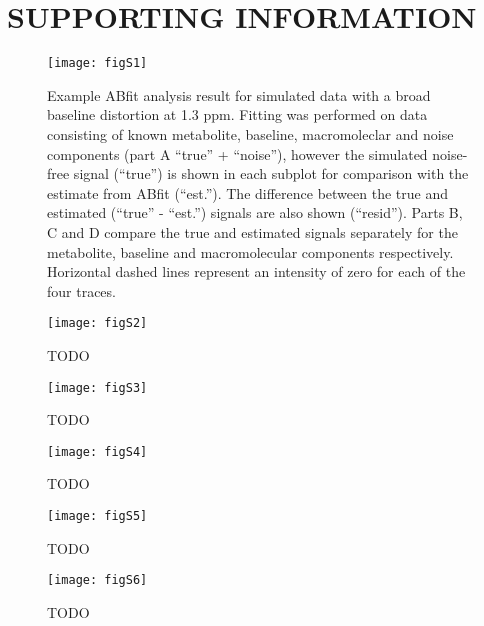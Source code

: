 \documentclass[num-refs]{wiley-article}
\begin{document}
\section*{SUPPORTING INFORMATION}

\begin{figure}[H]
  \begin{center}
    \texttt{[image: figS1]}
    \caption{Example ABfit analysis result for simulated data with a broad baseline distortion at 1.3 ppm. Fitting was performed on data consisting of known metabolite, baseline, macromoleclar and noise components (part A ``true'' + ``noise''), however the simulated noise-free signal (``true'') is shown in each subplot for comparison with the estimate from ABfit (``est.''). The difference between the true and estimated (``true'' - ``est.'') signals are also shown (``resid''). Parts B, C and D compare the true and estimated signals separately for the metabolite, baseline and macromolecular components respectively. Horizontal dashed lines represent an intensity of zero for each of the four traces.}
  \end{center}
\end{figure}

\begin{figure}
  \begin{center}
    \texttt{[image: figS2]}
    \caption{TODO}
  \end{center}
\end{figure}

\begin{figure}
  \begin{center}
    \texttt{[image: figS3]}
    \caption{TODO}
  \end{center}
\end{figure}

\begin{figure}
  \begin{center}
    \texttt{[image: figS4]}
    \caption{TODO}
  \end{center}
\end{figure}

\begin{figure}
  \begin{center}
    \texttt{[image: figS5]}
    \caption{TODO}
  \end{center}
\end{figure}

\begin{figure}
  \begin{center}
    \texttt{[image: figS6]}
    \caption{TODO}
  \end{center}
\end{figure}
\end{document}
